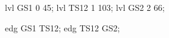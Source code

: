 \documentclass{article}
\begin{document}
		
	\begin{pes}
		lvl GS1 0 45;
		lvl TS12 1 103;
		lvl GS2 2 66;
		
		edg GS1 TS12;
		edg TS12 GS2;
	\end{pes}
	
\end{document}
